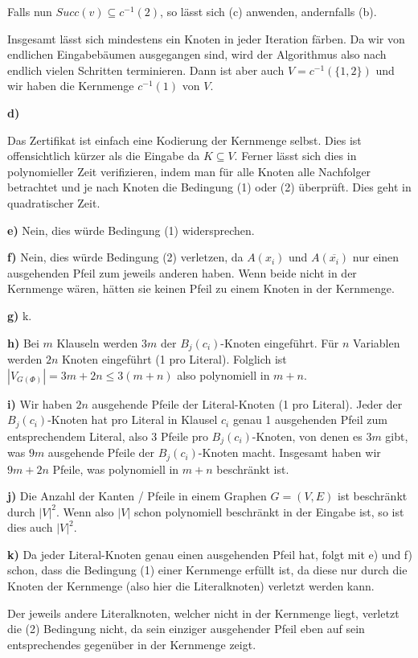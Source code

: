\documentclass[a4paper,graphics,11pt]{article}
\begin{document}
Falls nun $Succ(v) \subseteq c^{-1}(2)$, so lässt sich (c) anwenden, andernfalls (b).

Insgesamt lässt sich mindestens ein Knoten in jeder Iteration färben. Da wir von endlichen Eingabebäumen ausgegangen sind,
wird der Algorithmus also nach endlich vielen Schritten terminieren. Dann ist aber auch $V = c^{-1}(\{1,2\})$
und wir haben die Kernmenge $c^{-1}(1)$ von $V$.

\newpage

\textbf{d)}

Das Zertifikat ist einfach eine Kodierung der Kernmenge selbst. Dies ist offensichtlich kürzer als die Eingabe da
$K \subseteq V$. Ferner lässt sich dies in polynomieller Zeit verifizieren, indem man für alle Knoten
alle Nachfolger betrachtet und je nach Knoten die Bedingung (1) oder (2) überprüft. Dies geht in quadratischer Zeit.

\textbf{e)}
Nein, dies würde Bedingung (1) widersprechen.

\textbf{f)}
Nein, dies würde Bedingung (2) verletzen, da $A(x_i)$ und $A(\overline{x_i})$ nur einen ausgehenden Pfeil zum jeweils
anderen haben. Wenn beide nicht in der Kernmenge wären, hätten sie keinen Pfeil zu einem Knoten in der Kernmenge.

\textbf{g)} k.

\textbf{h)}
Bei $m$ Klauseln werden $3m$ der $B_j(c_i)$-Knoten eingeführt. Für $n$ Variablen werden $2n$ Knoten eingeführt (1 pro Literal).
Folglich ist $|V_{G(\Phi)}| = 3m+2n \leq 3(m+n)$ also polynomiell in $m+n$.

\textbf{i)}
Wir haben $2n$ ausgehende Pfeile der Literal-Knoten (1 pro Literal). Jeder der $B_j(c_i)$-Knoten hat pro Literal in Klausel $c_i$
genau 1 ausgehenden Pfeil zum entsprechendem Literal, also $3$ Pfeile pro $B_j(c_i)$-Knoten, von denen es $3m$ gibt, was
$9m$ ausgehende Pfeile der $B_j(c_i)$-Knoten macht. Insgesamt haben wir $9m + 2n$ Pfeile, was polynomiell in $m+n$ beschränkt ist.

\textbf{j)}
Die Anzahl der Kanten / Pfeile in einem Graphen $G = (V,E)$ ist beschränkt durch $|V|^2$.
Wenn also $|V|$ schon polynomiell beschränkt in der Eingabe ist, so ist dies auch $|V|^2$.

\textbf{k)}
Da jeder Literal-Knoten genau einen ausgehenden Pfeil hat, folgt mit e) und f) schon, dass die Bedingung (1) einer Kernmenge
erfüllt ist, da diese nur durch die Knoten der Kernmenge (also hier die Literalknoten) verletzt werden kann.

Der jeweils andere Literalknoten, welcher nicht in der Kernmenge liegt, verletzt die (2) Bedingung nicht, da sein
einziger ausgehender Pfeil eben auf sein entsprechendes gegenüber in der Kernmenge zeigt.
\end{document}
